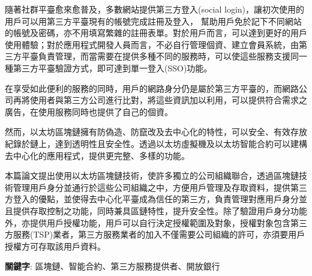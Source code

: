 \begin{abstractzh}

    隨著社群平臺愈來愈普及，多數網站提供第三方登入(social login)，讓初次使用的用戶可以用第三方平臺現有的帳號完成註冊及登入，
    幫助用戶免於記下不同網站的帳號及密碼，亦不用填寫繁雜的註冊表單。對於用戶而言，可以達到更好的用戶使用體驗；對於應用程式開發人員而言，不必自行管理個資、建立會員系統，由第三方平臺負責管理，而當需要在提供多種不同的服務時，可以使這些服務支援同一種第三方平臺驗證方式，即可達到單一登入(SSO)功能。\par
    在享受如此便利的服務的同時，用戶的網路身分仍是屬於第三方平臺的，而網路公司再將使用者與第三方公司進行比對，將這些資訊加以利用，可以提供符合需求之廣告，在使用服務同時也提供了自己的個資。\par
    然而，以太坊區塊鏈擁有防偽造、防竄改及去中心化的特性，可以安全、有效存放紀錄於鏈上，達到透明性且安全性。透過以太坊虛擬機及以太坊智能合約可以建構去中心化的應用程式，提供更完整、多樣的功能。\par
    本篇論文提出使用以太坊區塊鏈技術，使許多獨立的公司組織聯合，透過區塊鏈技術管理用戶身分並通行於這些公司組織之中，方便用戶管理及存取資料，提供第三方登入的優點，並使得去中心化平臺成為信任的第三方，負責管理對應用戶身分並且提供存取控制之功能，同時兼具區鏈特性，提升安全性。除了驗證用戶身分功能外，亦提供用戶授權功能，用戶可以自行決定授權範圍及對象，授權對象包含第三方服務(TSP)業者，第三方服務業者的加入不僅需要公司組織的許可，亦須要用戶授權方可存取該用戶資料。

\end{abstractzh}

\begin{flushleft}
    \textbf{關鍵字}: 區塊鏈、智能合約、第三方服務提供者、開放銀行
\end{flushleft}